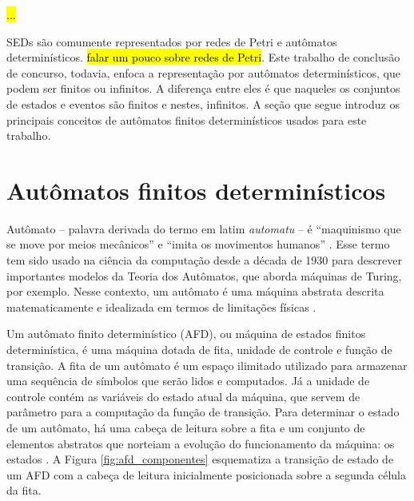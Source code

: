 \hl{...}

SEDs são comumente representados por redes de Petri e autômatos determinísticos. \hl{falar um pouco sobre redes de Petri}. Este trabalho de conclusão de concurso, todavia, enfoca a representação por autômatos determinísticos, que podem ser finitos ou infinitos. A diferença entre eles é que naqueles os conjuntos de estados e eventos são finitos e nestes, infinitos. A seção que segue introduz os principais conceitos de autômatos finitos determinísticos usados para este trabalho.

\section{Autômatos finitos determinísticos}

Autômato -- palavra derivada do termo em latim \textit{automatu} -- é ``maquinismo que se move por meios mecânicos'' e ``imita os movimentos humanos'' \cite[p. 81]{aurelio}. Esse termo tem sido usado na ciência da computação desde a década de 1930 para descrever importantes modelos da Teoria dos Autômatos, que aborda máquinas de Turing, por exemplo. Nesse contexto, um autômato é uma máquina abstrata descrita matematicamente e idealizada em termos de limitações físicas \cite{hopcroft}.

Um autômato finito determinístico (\acs{AFD}), ou máquina de estados finitos determinística, é uma máquina dotada de fita, unidade de controle e função de transição. A fita de um autômato é um espaço ilimitado utilizado para armazenar uma sequência de símbolos que serão lidos e computados. Já a unidade de controle contém as variáveis do estado atual da máquina, que servem de parâmetro para a computação da função de transição. Para determinar o estado de um autômato, há uma cabeça de leitura sobre a fita e um conjunto de elementos abstratos que norteiam a evolução do funcionamento da máquina: os estados \cite{hopcroft}. A Figura \ref{fig:afd_componentes} esquematiza a transição de estado de um AFD com a cabeça de leitura inicialmente posicionada sobre a segunda célula da fita.

